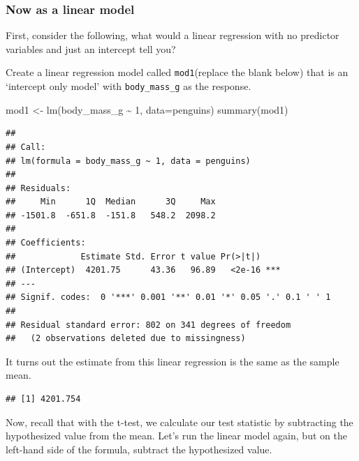 \documentclass[
  openany]{book}
\newenvironment{Shaded}{\begin{snugshade}}{\end{snugshade}}
\newcommand{\AttributeTok}[1]{\textcolor[rgb]{0.77,0.63,0.00}{#1}}
\newcommand{\CommentTok}[1]{\textcolor[rgb]{0.56,0.35,0.01}{\textit{#1}}}
\newcommand{\ConstantTok}[1]{\textcolor[rgb]{0.00,0.00,0.00}{#1}}
\newcommand{\DecValTok}[1]{\textcolor[rgb]{0.00,0.00,0.81}{#1}}
\newcommand{\FunctionTok}[1]{\textcolor[rgb]{0.00,0.00,0.00}{#1}}
\newcommand{\NormalTok}[1]{#1}
\newcommand{\OtherTok}[1]{\textcolor[rgb]{0.56,0.35,0.01}{#1}}
\newcommand{\SpecialCharTok}[1]{\textcolor[rgb]{0.00,0.00,0.00}{#1}}
\begin{document}
\hypertarget{now-as-a-linear-model}{%
\subsubsection{Now as a linear model}\label{now-as-a-linear-model}}

First, consider the following, what would a linear regression with no predictor variables and just an intercept tell you?

Create a linear regression model called \texttt{mod1}(replace the blank below) that is an `intercept only model' with \texttt{body\_mass\_g} as the response.

\begin{Shaded}
\begin{Highlighting}[]
\NormalTok{mod1 }\OtherTok{\textless{}{-}} \FunctionTok{lm}\NormalTok{(body\_mass\_g }\SpecialCharTok{\textasciitilde{}} \DecValTok{1}\NormalTok{, }\AttributeTok{data=}\NormalTok{penguins)}
\FunctionTok{summary}\NormalTok{(mod1)}
\end{Highlighting}
\end{Shaded}

\begin{verbatim}
## 
## Call:
## lm(formula = body_mass_g ~ 1, data = penguins)
## 
## Residuals:
##     Min      1Q  Median      3Q     Max 
## -1501.8  -651.8  -151.8   548.2  2098.2 
## 
## Coefficients:
##             Estimate Std. Error t value Pr(>|t|)    
## (Intercept)  4201.75      43.36   96.89   <2e-16 ***
## ---
## Signif. codes:  0 '***' 0.001 '**' 0.01 '*' 0.05 '.' 0.1 ' ' 1
## 
## Residual standard error: 802 on 341 degrees of freedom
##   (2 observations deleted due to missingness)
\end{verbatim}

It turns out the estimate from this linear regression is the same as the sample mean.

\begin{Shaded}
\end{Shaded}

\begin{verbatim}
## [1] 4201.754
\end{verbatim}

Now, recall that with the t-test, we calculate our test statistic by subtracting the hypothesized value from the mean. Let's run the linear model again, but on the left-hand side of the formula, subtract the hypothesized value.
\end{document}
